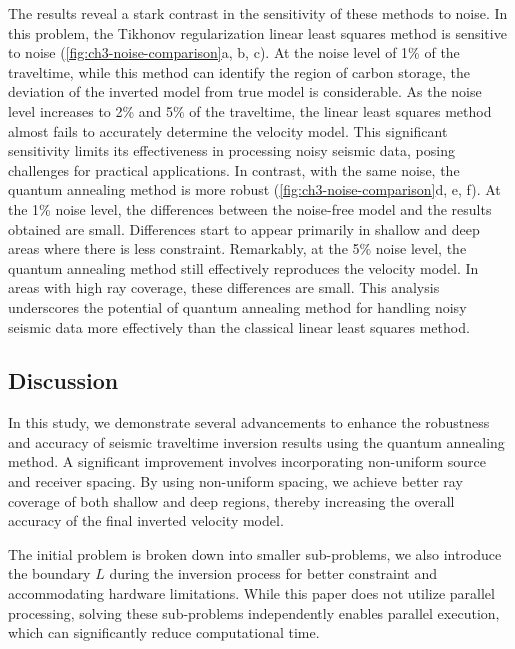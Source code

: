The results reveal a stark contrast in the sensitivity of these methods to noise. In this problem, the Tikhonov regularization linear least squares method is sensitive to noise (\ref{fig:ch3-noise-comparison}a, b, c). At the noise level of 1\% of the traveltime, while this method can identify the region of carbon storage, the deviation of the inverted model from true model is considerable. As the noise level increases to  2\% and 5\% of the traveltime, the linear least squares method almost fails to accurately determine the velocity model. This significant sensitivity limits its effectiveness in processing noisy seismic data, posing challenges for practical applications.
In contrast, with the same noise, the quantum annealing method is more robust (\ref{fig:ch3-noise-comparison}d, e, f). At the 1\% noise level, the differences between the noise-free model and the results obtained are small. Differences start to appear primarily in shallow and deep areas where there is less constraint. Remarkably, at the 5\% noise level, the quantum annealing method still effectively reproduces the velocity model. In areas with high ray coverage, these differences are small. This analysis underscores the potential of quantum annealing method for handling noisy seismic data more effectively than the classical linear least squares method.

\subsection{Discussion}

In this study, we demonstrate several advancements to enhance the robustness and accuracy of seismic traveltime inversion results using the quantum annealing method. A significant improvement involves incorporating non-uniform source and receiver spacing. By using non-uniform spacing, we achieve better ray coverage of both shallow and deep regions, thereby increasing the overall accuracy of the final inverted velocity model.

The initial problem is broken down into smaller sub-problems, we also introduce the boundary \(L\) during the inversion process for better constraint and accommodating hardware limitations. While this paper does not utilize parallel processing, solving these sub-problems independently enables parallel execution, which can significantly reduce computational time.

